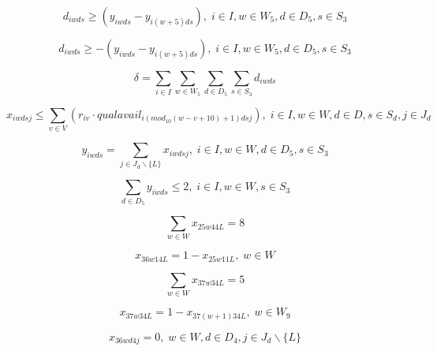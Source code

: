 \begin{equation}
d_{iwds} \geq (y_{iwds} - y_{i(w+5)ds}), \; i \in I, w \in W_5, d \in D_5, s \in S_3
\end{equation}

\begin{equation}
d_{iwds} \geq -(y_{iwds} - y_{i(w+5)ds}), \; i \in I, w \in W_5, d \in D_5, s \in S_3
\end{equation}

\begin{equation} %
\delta = \sum_{i \in I} \sum_{w \in W_5} \sum_{d \in D_5} \sum_{s \in S_3} d_{iwds}
\end{equation}

\begin{equation}
x_{iwdsj} \leq \sum_{v \in V} (r_{iv} \cdot qualavail_{i(mod_{10}(w-v+10)+1)dsj}), \; i \in I, w \in W, d \in D, s \in S_d, j \in J_d
\end{equation}

\begin{equation}
y_{iwds} = \sum_{j \in J_d \backslash \{L\}} x_{iwdsj}, \; i \in I, w \in W, d \in D_5, s \in S_3
\end{equation}

\begin{equation}
\sum_{d \in D_5} y_{iwds} \leq 2, \; i \in I, w \in W, s \in S_3
\end{equation}

\begin{equation}
\sum_{w \in W} x_{25w44L} = 8
\end{equation}

\begin{equation}
x_{36w14L} = 1 - x_{25w11L}, \; w \in W
\end{equation}

\begin{equation}
\sum_{w \in W} x_{37w34L} = 5
\end{equation}

\begin{equation}
x_{37w34L} = 1 - x_{37(w+1)34L}, \; w \in W_9
\end{equation}

\begin{equation}
x_{36wd4j} = 0, \; w \in W, d \in D_4, j \in J_d \backslash \{L\}
\end{equation}